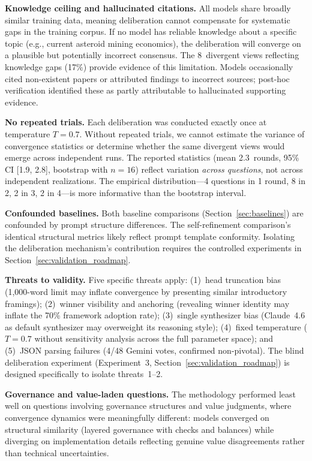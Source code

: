 \documentclass[11pt,a4paper]{article}
\begin{document}
\textbf{Knowledge ceiling and hallucinated citations.} All models share broadly similar training data, meaning deliberation cannot compensate for systematic gaps in the training corpus. If no model has reliable knowledge about a specific topic (e.g., current asteroid mining economics), the deliberation will converge on a plausible but potentially incorrect consensus. The 8~divergent views reflecting knowledge gaps (17\%) provide evidence of this limitation. Models occasionally cited non-existent papers or attributed findings to incorrect sources; post-hoc verification identified these as partly attributable to hallucinated supporting evidence.

\textbf{No repeated trials.} Each deliberation was conducted exactly once at temperature $T = 0.7$. Without repeated trials, we cannot estimate the variance of convergence statistics or determine whether the same divergent views would emerge across independent runs. The reported statistics (mean 2.3~rounds, 95\% CI [1.9, 2.8], bootstrap with $n=16$) reflect variation \emph{across questions}, not across independent realizations. The empirical distribution---4 questions in 1 round, 8 in 2, 2 in 3, 2 in 4---is more informative than the bootstrap interval.

\textbf{Confounded baselines.} Both baseline comparisons (Section~\ref{sec:baselines}) are confounded by prompt structure differences. The self-refinement comparison's identical structural metrics likely reflect prompt template conformity. Isolating the deliberation mechanism's contribution requires the controlled experiments in Section~\ref{sec:validation_roadmap}.

\textbf{Threats to validity.} Five specific threats apply: (1)~head truncation bias (1{,}000-word limit may inflate convergence by presenting similar introductory framings); (2)~winner visibility and anchoring (revealing winner identity may inflate the 70\% framework adoption rate); (3)~single synthesizer bias (Claude~4.6 as default synthesizer may overweight its reasoning style); (4)~fixed temperature ($T = 0.7$ without sensitivity analysis across the full parameter space); and (5)~JSON parsing failures (4/48 Gemini votes, confirmed non-pivotal). The blind deliberation experiment (Experiment~3, Section~\ref{sec:validation_roadmap}) is designed specifically to isolate threats~1--2.

\textbf{Governance and value-laden questions.} The methodology performed least well on questions involving governance structures and value judgments, where convergence dynamics were meaningfully different: models converged on structural similarity (layered governance with checks and balances) while diverging on implementation details reflecting genuine value disagreements rather than technical uncertainties.
\end{document}
